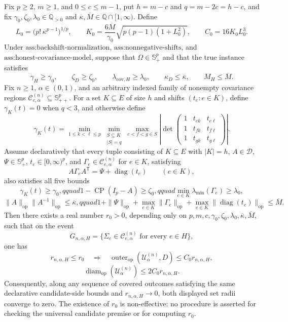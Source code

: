 Fix \(p\geq2\), \(m\geq1\), and \(0\leq c\leq m-1\), put \(h=m-c\) and \(q=m-2c=h-c\), and fix \(\gamma_0,\zeta_0,\lambda_0\in\mathbb Q_{>0}\) and \(\overline\kappa,\overline M\in\mathbb Q\cap[1,\infty)\). Define
\[
L_0=\bigl(p!\,\overline\kappa^{p-1}\bigr)^{1/p},
\qquad
K_0=\frac{6\overline M}{\gamma_0}
\sqrt{p(p-1)(1+L_0^2)},
\qquad
C_0=16K_0L_0^3.
\]
Under \(\text{ass:backshift-normalization}\), \(\text{ass:nonnegative-shifts}\), and \(\text{ass:honest-covariance-model}\), suppose that \(\Omega\in\mathbb S_+^p\) and that the true instance satisfies
\[
\gamma_H\geq\gamma_0,\qquad
\zeta_D\geq\zeta_0,\qquad
\lambda_{\mathrm{cov},H}\geq\lambda_0,\qquad
\kappa_D\leq\overline\kappa,\qquad
M_H\leq\overline M.
\]
Fix \(n\geq1\), \(\alpha\in(0,1)\), and an arbitrary indexed family of nonempty covariance regions \(\mathcal C^{(n)}_{e,\alpha}\subseteq\mathbb S_{++}^p\). For a set \(K\subseteq E\) of size \(h\) and shifts \((t_e:e\in K)\), define \(\gamma_K(t)=0\) when \(q<3\), and otherwise define
\[
\gamma_K(t)=
\min_{1\leq k<\ell\leq p}
\min_{\substack{S\subseteq K\\|S|=q}}
\max_{e<f<g\in S}
\left|
\det\begin{pmatrix}
1&t_{ek}&t_{e\ell}\\
1&t_{fk}&t_{f\ell}\\
1&t_{gk}&t_{g\ell}
\end{pmatrix}
\right|.
\]
Assume declaratively that every tuple consisting of \(K\subseteq E\) with \(|K|=h\), \(A\in\mathcal D\), \(\Psi\in\mathbb S_+^p\), \(t_e\in[0,\infty)^p\), and \(\Gamma_e\in\mathcal C^{(n)}_{e,\alpha}\) for \(e\in K\), satisfying
\[
A\Gamma_eA^{\mathsf T}=\Psi+\operatorname{diag}(t_e)
\qquad(e\in K),
\]
also satisfies all five bounds
\[
\gamma_K(t)\geq\gamma_0,qquad
1-\operatorname{CP}(I_p-A)\geq\zeta_0,qquad
\min_{e\in K}\lambda_{\min}(\Gamma_e)\geq\lambda_0,
\]
\[
\|A\|_{\mathrm{op}}\|A^{-1}\|_{\mathrm{op}}
\leq\overline\kappa,qquad
1+\|\Psi\|_{\mathrm{op}}
+\max_{e\in K}\|\Gamma_e\|_{\mathrm{op}}
+\max_{e\in K}\|\operatorname{diag}(t_e)\|_{\mathrm{op}}
\leq\overline M.
\]
Then there exists a real number \(r_0>0\), depending only on \(p,m,c,\gamma_0,\zeta_0,\lambda_0,\overline\kappa,\overline M\), such that on the event
\[
G_{n,\alpha,H}
=\{\Sigma_e\in\mathcal C^{(n)}_{e,\alpha}\text{ for every }e\in H\},
\]
one has
\[
r_{n,\alpha,H}\leq r_0
\quad\Longrightarrow\quad
\operatorname{outer}_{\mathrm{op}}(\mathcal U^{(n)}_\alpha,D)
\leq C_0r_{n,\alpha,H},
\]
\[
\operatorname{diam}_{\mathrm{op}}(\mathcal U^{(n)}_\alpha)
\leq2C_0r_{n,\alpha,H}.
\]
Consequently, along any sequence of covered outcomes satisfying the same declarative candidate-side bounds and \(r_{n,\alpha,H}\to0\), both displayed set radii converge to zero. The existence of \(r_0\) is non-effective: no procedure is asserted for checking the universal candidate premise or for computing \(r_0\).